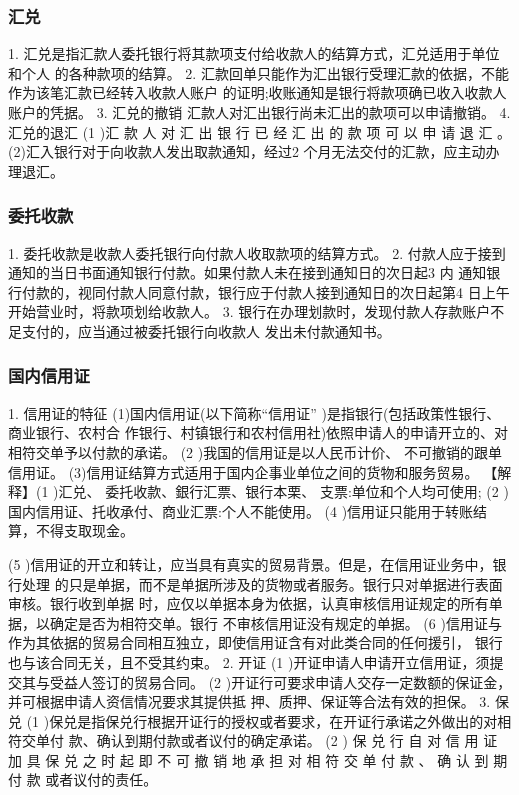 \documentclass[UTF8,12pt]{ctexart}
\numberwithin{equation}{section} %
\numberwithin{figure}{section}
\numberwithin{table}{section}
\begin{document}
	\subsubsection{汇兑}
	1. 汇兑是指汇款人委托银行将其款项支付给收款人的结算方式，汇兑适用于单位和个人
	的各种款项的结算。
	2. 汇款回单只能作为汇出银行受理汇款的依据，不能作为该笔汇款已经转入收款人账户
	的证明;收账通知是银行将款项确已收入收款人账户的凭据。
	3. 汇兑的撤销
	汇款人对汇出银行尚未汇出的款项可以申请撤销。
	4. 汇兑的退汇
	(1 )汇 款 人 对 汇 出 银 行 已 经 汇 出 的 款 项 可 以 申 请 退 汇 。
	(2)汇入银行对于向收款人发出取款通知，经过2 个月无法交付的汇款，应主动办理退汇。
	
	\subsubsection{委托收款} 
	1. 委托收款是收款人委托银行向付款人收取款项的结算方式。
	2. 付款人应于接到通知的当日书面通知银行付款。如果付款人未在接到通知日的次日起3
	内 通知银行付款的，视同付款人同意付款，银行应于付款人接到通知日的次日起第4 日上午
	开始营业时，将款项划给收款人。
	3. 银行在办理划款时，发现付款人存款账户不足支付的，应当通过被委托银行向收款人
	发出未付款通知书。
	
	
	\subsubsection{国内信用证} 
	1. 信用证的特征
	(1)国内信用证(以下简称“信用证” )是指银行(包括政策性银行、商业银行、农村合
	作银行、村镇银行和农村信用社)依照申请人的申请开立的、对相符交单予以付款的承诺。
	(2 )我国的信用证是以人民币计价、 不可撤销的跟单信用证。
	(3)信用证结算方式适用于国内企事业单位之间的货物和服务贸易。
	【解释】(1 )汇兑、 委托收款、銀行汇票、银行本栗、 支票:单位和个人均可使用;
	(2 )国内信用证、托收承付、商业汇票:个人不能使用。
	(4 )信用证只能用于转账结算，不得支取现金。
	
	(5 )信用证的开立和转让，应当具有真实的贸易背景。但是，在信用证业务中，银行处理
	的只是单据，而不是单据所涉及的货物或者服务。银行只对单据进行表面审核。银行收到单据
	时，应仅以单据本身为依据，认真审核信用证规定的所有单据，以确定是否为相符交单。银行
	不审核信用证没有规定的单据。
	(6 )信用证与作为其依据的贸易合同相互独立，即使信用证含有对此类合同的任何援引，
	银行也与该合同无关，且不受其约束。
	2. 开证
	(1 )开证申请人申请开立信用证，须提交其与受益人签订的贸易合同。
	(2 )开证行可要求申请人交存一定数额的保证金，并可根据申请人资信情况要求其提供抵
	押、质押、保证等合法有效的担保。
	3. 保兑
	(1 )保兑是指保兑行根据开证行的授权或者要求，在开证行承诺之外做出的对相符交单付
	款、确认到期付款或者议付的确定承诺。
	(2 ) 保 兑 行 自 对 信 用 证 加 具 保 兑 之 时 起 即 不 可 撤 销 地 承 担 对 相 符 交 单 付 款 、 确 认 到 期 付 款
	或者议付的责任。
	
\end{document}
